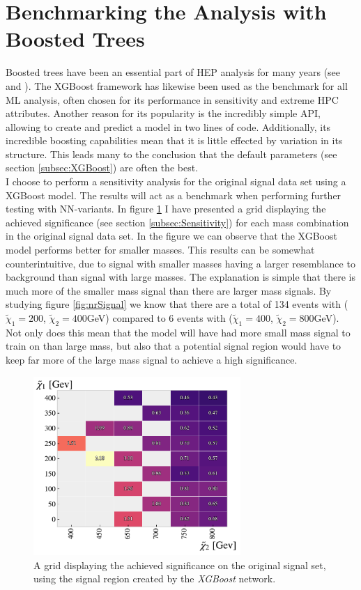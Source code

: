 \section{Benchmarking the Analysis with Boosted Trees}\label{sec:XGBoost}
Boosted trees have been an essential part of \ac{HEP} analysis for many years (see 
\cite{ATLAS-CONF-2011-152} and \cite{ATLAS-CONF-2017-064}). The XGBoost framework has likewise 
been used as the benchmark for all \ac{ML} analysis, often chosen for its performance in sensitivity and 
extreme \ac{HPC} attributes. Another reason for its popularity is the incredibly simple \ac{API}, allowing 
to create and predict a model in two lines of code. Additionally, its incredible boosting capabilities mean 
that it is little effected by variation in its structure. This leads many to the conclusion that the default 
parameters (see section \ref{subsec:XGBoost}) are often the best. 
\\
I choose to perform a sensitivity analysis for the original signal data set using a XGBoost model. The results
will act as a benchmark when performing further testing with \ac{NN}-variants. In figure \ref{fig:XGBoost} 
I have presented a grid displaying the achieved significance (see section \ref{subsec:Sensitivity}) for each 
mass combination in the original signal data set. In the figure we can observe that the XGBoost model performs
better for smaller masses. This results can be somewhat counterintuitive, due to signal with smaller masses 
having a larger resemblance to background than signal with large masses. The explanation is simple that there is much more 
of the smaller mass signal than there are larger mass signals. By studying figure \ref{fig:nrSignal} we know that 
there are a total of 134 events with ($\tilde{\chi}_1=200$, $\tilde{\chi}_2=400$GeV) compared to 6 events 
with ($\tilde{\chi}_1=400$, $\tilde{\chi}_2=800$GeV). Not only does this mean that the model will have had 
more small mass signal to train on than large mass, but also that a potential signal region would have to keep 
far more of the large mass signal to achieve a high significance.
\\
\begin{figure}
    \centering
    \includegraphics[width=0.7\textwidth]{Figures/MLResults/XGB/SUSY/Grid/XGBGridSig.pdf}
    \caption{A grid displaying the achieved significance on the original signal set, using the signal region 
    created by the \emph{XGBoost} network.}
    \label{fig:XGBoost}
\end{figure}
